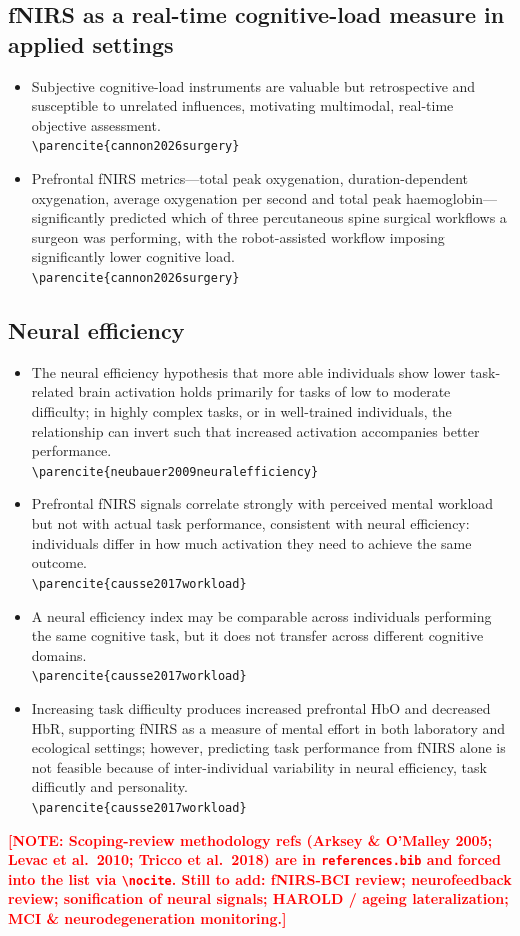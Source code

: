 \documentclass[11pt,a4paper]{article}
\newcommand{\note}[1]{\textcolor{red}{\textbf{[NOTE: #1]}}}
\newcommand{\fact}[2]{%
  \item #2~\parencite{#1}
    \\[-2pt]{\footnotesize\color{gray}\texttt{\textbackslash parencite\{#1\}}}%
}
\begin{document}
\subsection{fNIRS as a real-time cognitive-load measure in applied settings}
\begin{itemize}[leftmargin=1.4em]
  \fact{cannon2026surgery}{Subjective cognitive-load instruments are valuable
  but retrospective and susceptible to unrelated influences, motivating
  multimodal, real-time objective assessment.}
  \fact{cannon2026surgery}{Prefrontal fNIRS metrics---total peak oxygenation,
  duration-dependent oxygenation, average oxygenation per second and total peak
  haemoglobin---significantly predicted which of three percutaneous spine
  surgical workflows a surgeon was performing, with the robot-assisted workflow
  imposing significantly lower cognitive load.}
\end{itemize}

\subsection{Neural efficiency}
\begin{itemize}[leftmargin=1.4em]
  \fact{neubauer2009neuralefficiency}{The neural efficiency hypothesis that more
  able individuals show lower task-related brain activation holds primarily for
  tasks of low to moderate difficulty; in highly complex tasks, or in
  well-trained individuals, the relationship can invert such that increased
  activation accompanies better performance.}
  \fact{causse2017workload}{Prefrontal fNIRS signals correlate strongly with
  perceived mental workload but not with actual task performance, consistent
  with neural efficiency: individuals differ in how much activation they need to
  achieve the same outcome.}
  \fact{causse2017workload}{A neural efficiency index may be comparable across
  individuals performing the same cognitive task, but it does not transfer
  across different cognitive domains.}
  \fact{causse2017workload}{Increasing task difficulty produces increased
  prefrontal HbO and decreased HbR, supporting fNIRS as a measure of mental
  effort in both laboratory and ecological settings; however, predicting task
  performance from fNIRS alone is not feasible because of inter-individual
  variability in neural efficiency, task difficutly and personality.}
\end{itemize}



\nocite{arksey2005scoping,levac2010scoping,tricco2018prismascr}
\printbibliography[heading=bibintoc,title={References}]
\note{Scoping-review methodology refs (Arksey \& O'Malley 2005; Levac et al.\
2010; Tricco et al.\ 2018) are in \texttt{references.bib} and forced into the
list via \texttt{\textbackslash nocite}. Still to add: fNIRS-BCI review;
neurofeedback review; sonification of neural signals; HAROLD / ageing
lateralization; MCI \& neurodegeneration monitoring.}
\end{document}
